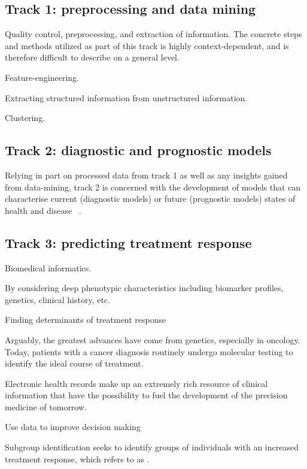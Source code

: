 \subsection{Track 1: preprocessing and data mining}

Quality control, preprocessing, and extraction of information.
The concrete steps and methods utilized as part of this track
is highly context-dependent, 
and is therefore difficult to describe on a general level. 

Feature-engineering.

Extracting structured information from unstructured information.

Clustering.

\subsection{Track 2: diagnostic and prognostic models}

Relying in part on processed data from track 1
as well as any insights gained from data-mining,
track 2 is concerned with the development
of models that can characterise current (diagnostic models)
or future (prognostic models) states of health and disease~%
\autocite{konigWhat2017}. 

\subsection{Track 3: predicting treatment response}

Biomedical informatics.

By considering deep phenotypic characteristics including 
biomarker profiles, genetics, clinical history, etc. 

Finding determinants of treatment response

Arguably, the greatest advances have come from genetics, especially in oncology.
Today, patients with a cancer diagnosis routinely undergo molecular testing
to identify the ideal course of treatment.

Electronic health records make up an extremely rich resource of clinical
information that have the possibility to fuel the development of the 
precision medicine of tomorrow.

Use data to improve decision making

Subgroup identification seeks to identify groups of individuals with an
increased treatment response, which
\citeauthor{kosorokPrecision2019} refers to as 
.


